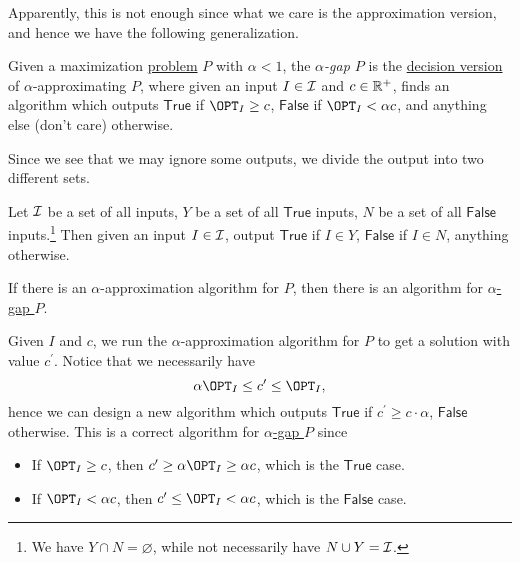 Apparently, this is not enough since what we care is the approximation version, and hence we have the following generalization.

\begin{definition}\label{def:gap-P}
	Given a maximization \hyperref[def:combinatorial-optimization]{problem} \(P\) with \(\alpha < 1\), the \emph{\(\alpha \)-gap \(P\)} is the \hyperref[def:decision-P]{decision version} of \(\alpha\)-approximating \(P\), where given an input \(I\in \mathcal{\MakeUppercase{i}} \) and \(c\in \mathbb{\MakeUppercase{r}} ^+\), finds an algorithm which outputs \(\textsf{True}\) if \(\OPT_I \geq c\), \(\textsf{False}\) if \(\OPT_I < \alpha c\), and anything else (don't care) otherwise.
\end{definition}

Since we see that we may ignore some outputs, we divide the output into two different sets.

\begin{notation}
	Let \(\mathcal{\MakeUppercase{i}} \) be a set of all inputs, \(Y\) be a set of all \(\textsf{True}\) inputs, \(N\) be a set of all \(\textsf{False}\) inputs.\footnote{We have \(Y \cap N = \varnothing \), while not necessarily have \(N \cup Y = \mathcal{\MakeUppercase{i}} \).} Then given an input \(I\in \mathcal{\MakeUppercase{i}} \), output \(\textsf{True}\) if \(I\in Y\), \(\textsf{False}\) if \(I\in N\), anything otherwise.
\end{notation}

\begin{remark}
	If there is an \(\alpha \)-approximation algorithm for \(P\), then there is an algorithm for \hyperref[def:gap-P]{\(\alpha \)-gap \(P\)}.
\end{remark}
\begin{explanation}
	Given \(I\) and \(c\), we run the \(\alpha \)-approximation algorithm for \(P\) to get a solution with value \(c^\prime \). Notice that we necessarily have
	\[
		\alpha \OPT_I \leq c^\prime \leq \OPT_I,
	\]
	hence we can design a new algorithm which outputs \(\textsf{True}\) if \(c^\prime \geq c \cdot \alpha \), \(\textsf{False}\) otherwise. This is a correct algorithm for \hyperref[def:gap-P]{\(\alpha \)-gap \(P\)} since
	\begin{itemize}
		\item If \(\OPT_I \geq c\), then \(c^\prime \geq \alpha \OPT_I \geq \alpha c\), which is the \(\textsf{True}\) case.
		\item If \(\OPT_I < \alpha c\), then \(c^\prime \leq \OPT_I < \alpha c\), which is the \(\textsf{False}\) case.
	\end{itemize}
\end{explanation}

